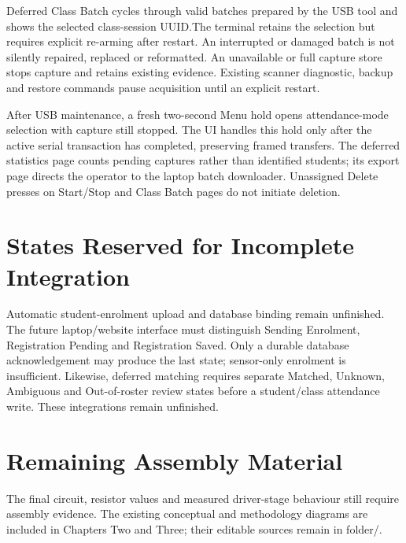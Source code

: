Deferred Class Batch cycles through valid batches prepared by the USB tool and
shows the selected class-session UUID.\@ The terminal retains the selection but
requires explicit re-arming after restart. An interrupted or damaged batch is
not silently repaired, replaced or reformatted. An unavailable or full capture
store stops capture and retains existing evidence. Existing scanner diagnostic,
backup and restore commands pause acquisition until an explicit restart.

After USB maintenance, a fresh two-second Menu hold opens attendance-mode
selection with capture still stopped. The UI handles this hold only after the
active serial transaction has completed, preserving framed transfers. The
deferred statistics page counts pending captures rather than identified students;
its export page directs the operator to the laptop batch downloader. Unassigned
Delete presses on Start/Stop and Class Batch pages do not initiate deletion.

\section{States Reserved for Incomplete Integration}

Automatic student-enrolment upload and database binding remain unfinished. The
future laptop/website interface must distinguish Sending Enrolment, Registration
Pending and Registration Saved. Only a durable database acknowledgement may
produce the last state; sensor-only enrolment is insufficient. Likewise, deferred
matching requires separate Matched, Unknown, Ambiguous and Out-of-roster review
states before a student/class attendance write. These integrations remain
unfinished.

\section{Remaining Assembly Material}

The final circuit, resistor values and measured driver-stage behaviour still
require assembly evidence. The existing conceptual and methodology diagrams are
included in Chapters Two and Three; their editable sources remain in folder/.
